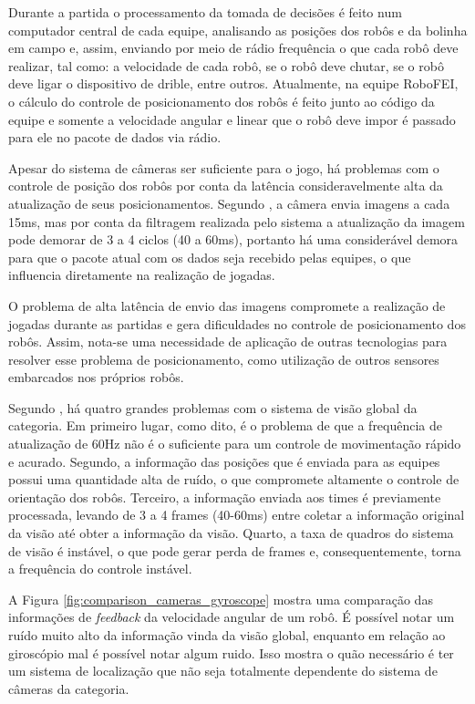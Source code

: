 \documentclass[acronym, symbols, table, deposito]{fei}
\begin{document}
			Durante a partida o processamento da tomada de decisões é feito num computador central de cada equipe, analisando as posições dos robôs e da bolinha em campo e, assim, enviando por meio de rádio frequência o que cada robô deve realizar, tal como: a velocidade de cada robô, se o robô deve chutar, se o robô deve ligar o dispositivo de drible, entre outros. Atualmente, na equipe RoboFEI, o cálculo do controle de posicionamento dos robôs é feito junto ao código da equipe e somente a velocidade angular e linear que o robô deve impor é passado para ele no pacote de dados via rádio.
		
			Apesar do sistema de câmeras ser suficiente para o jogo, há problemas com o controle de posição dos robôs por conta da latência consideravelmente alta da atualização de seus posicionamentos. Segundo \textcite{tdpZJUNlict2020}, a câmera envia imagens a cada 15ms, mas por conta da filtragem realizada pelo sistema a atualização da imagem pode demorar de 3 a 4 ciclos (40 a 60ms), portanto há uma considerável demora para que o pacote atual com os dados seja recebido pelas equipes, o que influencia diretamente na realização de jogadas.
			
			O problema de alta latência de envio das imagens compromete a realização de jogadas durante as partidas e gera dificuldades no controle de posicionamento dos robôs. Assim, nota-se uma necessidade de aplicação de outras tecnologias para resolver esse problema de posicionamento, como utilização de outros sensores embarcados nos próprios robôs.
			
			Segundo \textcite{tdpZJUNlict2020}, há quatro grandes problemas com o sistema de visão global da categoria. Em primeiro lugar, como dito, é o problema de que a frequência de atualização de 60Hz não é o suficiente para um controle de movimentação rápido e acurado. Segundo, a informação das posições que é enviada para as equipes possui uma quantidade alta de ruído, o que compromete altamente o controle de orientação dos robôs. Terceiro, a informação enviada aos times é previamente processada, levando de 3 a 4 frames (40-60ms) entre coletar a informação original da visão até obter a informação da visão. Quarto, a taxa de quadros do sistema de visão é instável, o que pode gerar perda de frames e, consequentemente, torna a frequência do controle instável.
			
			A Figura \ref{fig:comparison_cameras_gyroscope} mostra uma comparação das informações de \textit{feedback} da velocidade angular de um robô. É possível notar um ruído muito alto da informação vinda da visão global, enquanto em relação ao giroscópio mal é possível notar algum ruido. Isso mostra o quão necessário é ter um sistema de localização que não seja totalmente dependente do sistema de câmeras da categoria.
			
\end{document}
